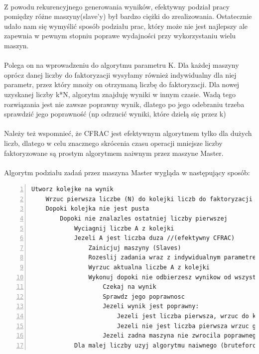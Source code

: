 \documentclass{article}
\begin{document}
\paragraph{}Z powodu rekurencyjnego generowania wyników, efektywny podział pracy pomiędzy różne maszyny(slave'y) był bardzo ciężki do zrealizowania. Ostatecznie udało nam się wymyślić sposób podziału prac, który może nie jest najlepszy ale zapewnia w pewnym stopniu poprawe wydajności przy wykorzystaniu wielu maszyn.

\paragraph{}Polega on na wprowadzeniu do algorytmu parametru K. Dla każdej maszyny oprócz danej liczby do faktoryzacji wysyłamy również indywidualny dla niej parametr, przez który mnoży on otrzymaną liczbę do faktoryzacji. Dla nowej uzyskanej liczby k*N, algorytm znajduję wyniki w innym czasie. Wadą tego rozwiązania jest nie zawsze poprawny wynik, dlatego po jego odebraniu trzeba sprawdzić jego poprawność (np odrzucić wyniki, które dzielą się przez k)

\paragraph{}Należy też wspomnieć, że CFRAC jest efektywnym algorytmem tylko dla dużych liczb, dlatego w celu znacznego skrócenia czasu operacji mniejsze liczby faktoryzowane są prostym algorytmem naiwnym przez maszyne Master.

\paragraph{}Algorytm podziału zadań przez maszyna Master wygląda w następujący sposób:

\begin{lstlisting}[caption=Sekwencja instrukcji algorytmu CFRAC,numbers=left]
    Utworz kolejke na wynik
    Wrzuc pierwsza liczbe (N) do kolejki liczb do faktoryzacji
    Dopoki kolejka nie jest pusta 
        Dopoki nie znalazles ostatniej liczby pierwszej
            Wyciagnij liczbe A z kolejki 
            Jezeli A jest liczba duza //(efektywny CFRAC) 
                Zainicjuj maszyny (Slaves) 
                Rozeslij zadania wraz z indywidualnym parametrem K 
                Wyrzuc aktualna liczbe A z kolejki 
                Wykonuj dopoki nie odbierzesz wynikow od wszystkich maszyn 
                    Czekaj na wynik 
                    Sprawdz jego poprawnosc 
                    Jezeli wynik jest poprawny: 
                        Jezeli jest liczba pierwsza, wrzuc do kolejki wynikow
                        Jezeli nie jest liczba pierwsza wrzuc go oraz jego iloraz z liczba A do kolejki liczb do faktoryzacji 
                    Jezeli zadna maszyna nie zwrocila poprawnego wyniku, zmien parametr k i wrzuc z powrotem liczbe A do kolejki liczb do faktoryzacji 
            Dla malej liczby uzyj algorytmu naiwnego (bruteforce)
\end{lstlisting}
\end{document}
